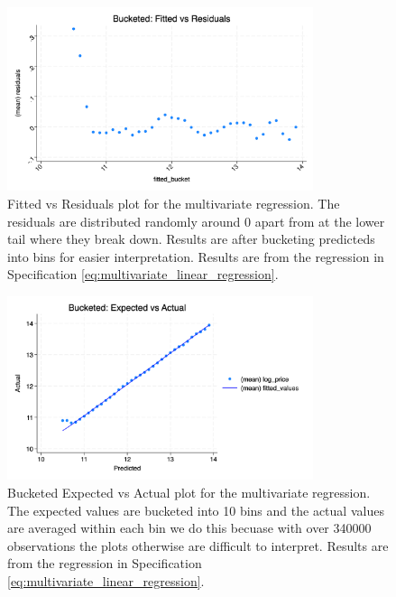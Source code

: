 \begin{figure}
    \centering
    \includegraphics[width=0.8\textwidth]{../figs/MV_fitted_vs_residuals.png}
    \caption{Fitted vs Residuals plot for the multivariate regression. The residuals are distributed randomly around 0 apart from at the lower tail where they break down.
    Results are after bucketing predicteds into bins for easier interpretation.
    Results are from the regression in Specification \ref{eq:multivariate_linear_regression}.}
    \label{MV_fitted_vs_residuals}
\end{figure}

\begin{figure}
    \centering
    \includegraphics[width=0.8\textwidth]{../figs/MV_bucketed_expected_vs_actual.png}
    \caption{Bucketed Expected vs Actual plot for the multivariate regression. The expected values are bucketed into 10 bins and the actual values are averaged within each bin
    we do this becuase with over 340000 observations the plots otherwise are difficult to interpret. 
    Results are from the regression in Specification \ref{eq:multivariate_linear_regression}.}
    \label{MV_bucketed_predicted_vs_actual}
\end{figure}

